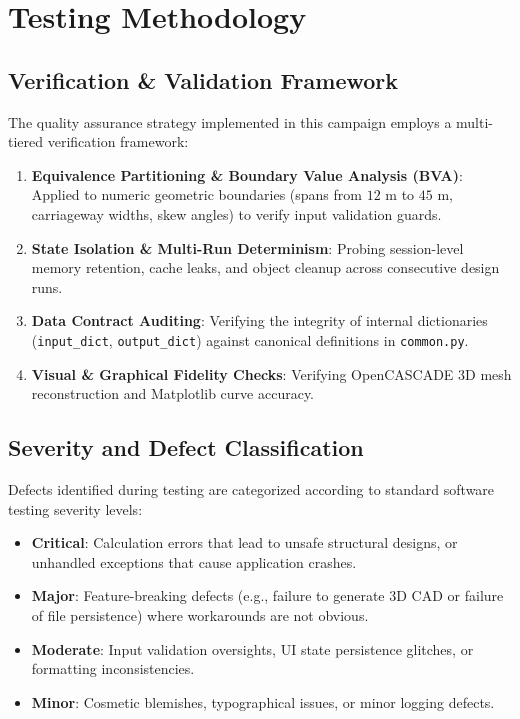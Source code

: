 \chapter{Testing Methodology}
\label{chap:testing_methodology}

\section{Verification \& Validation Framework}
The quality assurance strategy implemented in this campaign employs a multi-tiered verification framework:
\begin{enumerate}
    \item \textbf{Equivalence Partitioning \& Boundary Value Analysis (BVA)}: Applied to numeric geometric boundaries (spans from $12\text{ m}$ to $45\text{ m}$, carriageway widths, skew angles) to verify input validation guards.
    \item \textbf{State Isolation \& Multi-Run Determinism}: Probing session-level memory retention, cache leaks, and object cleanup across consecutive design runs.
    \item \textbf{Data Contract Auditing}: Verifying the integrity of internal dictionaries (\texttt{input\_dict}, \texttt{output\_dict}) against canonical definitions in \texttt{common.py}.
    \item \textbf{Visual \& Graphical Fidelity Checks}: Verifying OpenCASCADE 3D mesh reconstruction and Matplotlib curve accuracy.
\end{enumerate}

\section{Severity and Defect Classification}
Defects identified during testing are categorized according to standard software testing severity levels:
\begin{itemize}
    \item \textbf{Critical}: Calculation errors that lead to unsafe structural designs, or unhandled exceptions that cause application crashes.
    \item \textbf{Major}: Feature-breaking defects (e.g., failure to generate 3D CAD or failure of file persistence) where workarounds are not obvious.
    \item \textbf{Moderate}: Input validation oversights, UI state persistence glitches, or formatting inconsistencies.
    \item \textbf{Minor}: Cosmetic blemishes, typographical issues, or minor logging defects.
\end{itemize}
